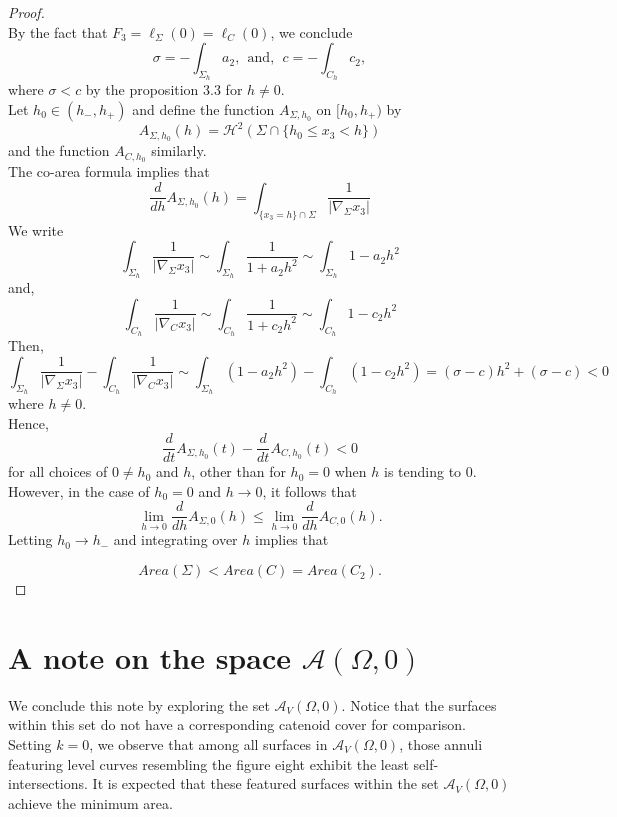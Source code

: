 \documentclass[11pt]{amsart}
\numberwithin{equation}{section}
\theoremstyle{theorem}
\theoremstyle{definition}
\numberwithin{equation}{section}
\begin{document}
\begin{proof}
$$    $$
  By the fact that $F_3=\ell_{\Sigma}(0)=\ell_C(0)$, we conclude
  $$
  \sigma = - \int_{\Sigma_h}a_2,\ \ \text{and},\ \ c= -\int_{C_h}c_2,
  $$
where $\sigma < c$ by the proposition 3.3 for $h\neq 0$.\\
 Let $h_0 \in (h_-,h_+)$ and define the function $A_{\Sigma ,h_0}$ on $[h_0,h_+)$ by
    $$
    A_{\Sigma ,h_0}(h) = \mathcal{H}^2(\Sigma \cap \{ h_0 \leq x_3 <h\})
    $$
    and the function $A_{C,h_0}$ similarly.\\
    The co-area formula implies that 
    $$
    \frac{d}{dh}A_{\Sigma ,h_0} (h) = \int_{\{ x_3=h\} \cap \Sigma} \frac{1}{\vert \nabla_{\Sigma}x_3 \vert}
    $$
We write
$$
 \int_{\Sigma_h} \frac{1}{\vert \nabla_{\Sigma}x_3 \vert} \sim \int_{\Sigma_h} \frac{1}{1+a_2h^2} \sim \int_{\Sigma_h} 1-a_2h^2 
$$
 and,  
   $$
 \int_{C_h} \frac{1}{\vert \nabla_{C}x_3 \vert} \sim \int_{C_h} \frac{1}{1+c_2h^2} \sim \int_{C_h} 1-c_2h^2 
$$
 Then,
$$
 \int_{\Sigma_h} \frac{1}{\vert \nabla_{\Sigma}x_3 \vert} -  \int_{C_h} \frac{1}{\vert \nabla_{C}x_3 \vert} \sim \int_{\Sigma_h} (1-a_2h^2) - \int_{C_h} (1-c_2h^2) = (\sigma -c)h^2+(\sigma -c) <0
$$ 
where $h\neq 0$.\\
  Hence,
    $$
    \frac{d}{dt} A_{\Sigma ,h_0}(t) - \frac{d}{dt} A_{C ,h_0}(t) <0
    $$
    for all choices of $0\neq h_0$ and $h$, other than for $h_0=0$ when $h$ is tending to $0$. However, in the case of $h_0=0$ and $h\rightarrow 0$, it follows that
    $$
   \lim_{h\rightarrow 0} \frac{d}{dh} A_{\Sigma ,0}(h) \leq \lim_{h\rightarrow 0} \frac{d}{dh} A_{C ,0}(h).
    $$
    Letting $h_0 \rightarrow h_-$ and integrating over $h$ implies that 
   
    $$
   Area(\Sigma) < Area (C)= Area (C_2).
    $$ 
\end{proof}

\section{A note on the space $\mathcal{A}(\Omega,0)$}
 We conclude this note by exploring the set $\mathcal{A}_V(\Omega, 0)$. Notice that the surfaces within this set do not have a corresponding catenoid cover for comparison.
 Setting $k=0$, we observe that among all surfaces in $\mathcal{A}_V(\Omega, 0)$, those annuli featuring level curves resembling the figure eight exhibit the least self-intersections. It is expected that these featured surfaces within the set $\mathcal{A}_V(\Omega, 0)$ achieve the minimum area. 
\end{document}
